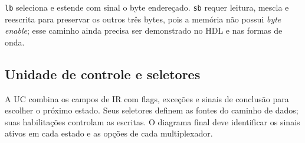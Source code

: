 \texttt{lb} seleciona e estende com sinal o byte endereçado. \texttt{sb} requer leitura, mescla e reescrita para preservar os outros três bytes, pois a memória não possui \emph{byte enable}; esse caminho ainda precisa ser demonstrado no HDL e nas formas de onda.

\subsection{Unidade de controle e seletores}\label{subsec:uc-entidade}

A UC combina os campos de IR com flags, exceções e sinais de conclusão para escolher o próximo estado. Seus seletores definem as fontes do caminho de dados; suas habilitações controlam as escritas. O diagrama final deve identificar os sinais ativos em cada estado e as opções de cada multiplexador.

